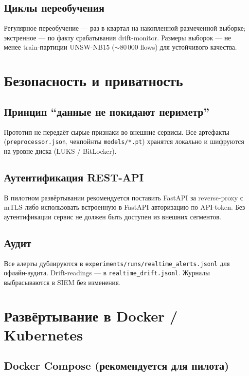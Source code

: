 \documentclass[14pt, a4paper]{extarticle}
\begin{document}
\subsection{Циклы переобучения}

Регулярное переобучение --- раз в квартал на накопленной
размеченной выборке; экстренное --- по факту срабатывания
drift-monitor. Размеры выборок --- не менее train-партиции UNSW-NB15
(\(\sim 80\,000\) flows) для устойчивого качества.

\section{Безопасность и приватность}

\subsection{Принцип ``данные не покидают периметр''}

Прототип не передаёт сырые признаки во внешние сервисы. Все артефакты
(\texttt{preprocessor.json}, чекпойнты \texttt{models/*.pt}) хранятся
локально и шифруются на уровне диска (LUKS / BitLocker).

\subsection{Аутентификация REST-API}

В пилотном развёртывании рекомендуется поставить FastAPI за
reverse-proxy с mTLS либо использовать встроенную в FastAPI
авторизацию по API-token. Без аутентификации сервис не должен быть
доступен из внешних сегментов.

\subsection{Аудит}

Все алерты дублируются в \texttt{experiments/runs/realtime\_alerts.jsonl}
для офлайн-аудита. Drift-readings --- в
\texttt{realtime\_drift.jsonl}. Журналы выбрасываются в SIEM
без изменения.

\section{Развёртывание в Docker / Kubernetes}

\subsection{Docker Compose (рекомендуется для пилота)}
\end{document}
